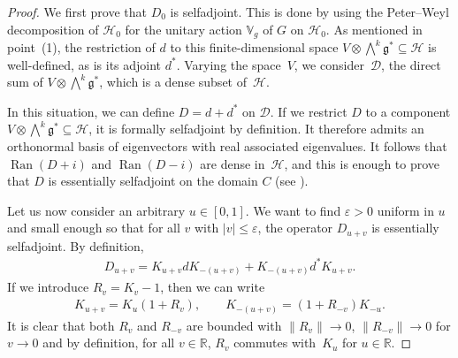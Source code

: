 \documentclass[pdftex]{sigma}
\newcommand{\Core}{C}
\newcommand{\Dd}{\mathscr{D}}
\newcommand{\Hh}{\mathscr{H}}
\newcommand{\LieG}{\mathfrak{g}}
\newcommand{\R}{\mathbb{R}}
\newcommand{\RepV}{\mathbb{V}}
\DeclareMathOperator{\Ran}{Ran}
\numberwithin{equation}{section}
\begin{document}
\begin{proof}
We f\/irst prove that $D_0$ is selfadjoint. This is done by using the Peter--Weyl decomposition of $\Hh_0$ for the unitary action $\RepV_g$ of $G$ on $\Hh_0$. As mentioned in point~(1), %
the restriction of $d$ to this f\/inite-dimensional space $V \otimes \bigwedge^k \LieG^* \subseteq \Hh$ is well-def\/ined, as is its adjoint $d^*$. Varying the space~$V$, we consider~$\Dd$, the direct sum of $V \otimes \bigwedge^k \LieG^*$, which is a dense subset of~$\Hh$.

In this situation, we can def\/ine $D = d + d^*$ on $\Dd$. If we restrict $D$ to a component $V \otimes \bigwedge^k \LieG^* \subseteq \Hh$, it is formally selfadjoint by def\/inition. It therefore admits an orthonormal basis of eigenvectors with real associated eigenvalues. It follows that $\Ran(D +i)$ and $\Ran(D -i)$ are dense in~$\Hh$, and this is enough to prove that $D$ is essentially selfadjoint on the domain $\Core$ (see \cite[Corollary, p.~257]{ReedSimon1}).

Let us now consider an arbitrary $u \in [0,1]$. We want to f\/ind $\varepsilon > 0$ uniform in $u$ and small enough so that for all $v$ with $|v| \leqslant \varepsilon$, the operator $D_{u+v}$ is essentially selfadjoint. By def\/inition,
\begin{gather*}
D_{u+v} = K_{u+v} d K_{-(u+v)} + K_{-(u+v)} d^* K_{u+v}.
\end{gather*}
If we introduce $R_v = K_v -1$, then we can write
\begin{gather*}
K_{u+v} = K_u (1 + R_v),
\qquad
K_{-(u+v)} = (1 + R_{-v}) K_{-u}.
\end{gather*}
It is clear that both $R_v$ and $R_{-v}$ are bounded with $\|R_v \| \to 0$, $\|R_{-v} \| \to 0$ for $v \to 0$ and by def\/inition, for all $v \in \R$, $R_v$ commutes with~$K_u$ for $u \in \R$.


\end{proof}
\end{document}
